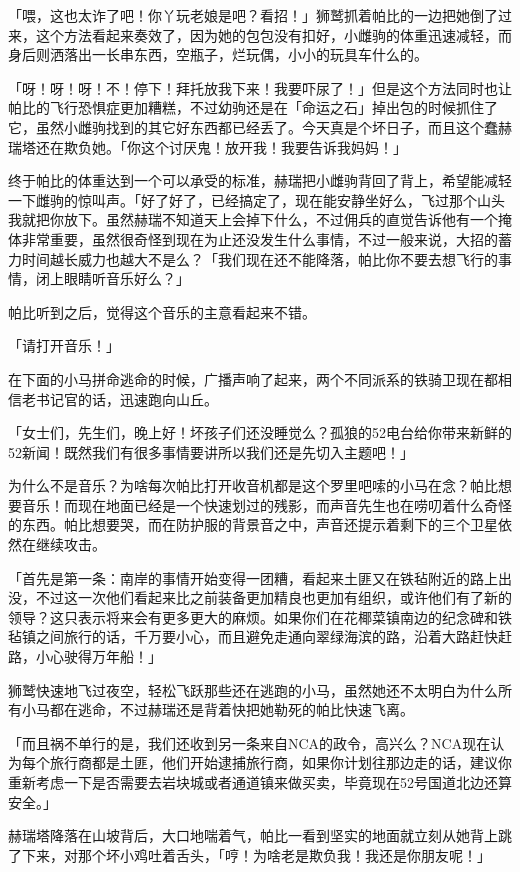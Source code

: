 「喂，这也太诈了吧！你丫玩老娘是吧？看招！」狮鹫抓着帕比的一边把她倒了过来，这个方法看起来奏效了，因为她的包包没有扣好，小雌驹的体重迅速减轻，而身后则洒落出一长串东西，空瓶子，烂玩偶，小小的玩具车什么的。

「呀！呀！呀！不！停下！拜托放我下来！我要吓尿了！」但是这个方法同时也让帕比的飞行恐惧症更加糟糕，不过幼驹还是在「命运之石」掉出包的时候抓住了它，虽然小雌驹找到的其它好东西都已经丢了。今天真是个坏日子，而且这个蠢赫瑞塔还在欺负她。「你这个讨厌鬼！放开我！我要告诉我妈妈！」

终于帕比的体重达到一个可以承受的标准，赫瑞把小雌驹背回了背上，希望能减轻一下雌驹的惊叫声。「好了好了，已经搞定了，现在能安静坐好么，飞过那个山头我就把你放下。虽然赫瑞不知道天上会掉下什么，不过佣兵的直觉告诉他有一个掩体非常重要，虽然很奇怪到现在为止还没发生什么事情，不过一般来说，大招的蓄力时间越长威力也越大不是么？「我们现在还不能降落，帕比你不要去想飞行的事情，闭上眼睛听音乐好么？」

帕比听到之后，觉得这个音乐的主意看起来不错。

「请打开音乐！」

在下面的小马拼命逃命的时候，广播声响了起来，两个不同派系的铁骑卫现在都相信老书记官的话，迅速跑向山丘。

「{\rt 女士们，先生们，晚上好！坏孩子们还没睡觉么？孤狼的52电台给你带来新鲜的52新闻！既然我们有很多事情要讲所以我们还是先切入主题吧！}」

为什么不是音乐？为啥每次帕比打开收音机都是这个罗里吧嗦的小马在念？帕比想要音乐！而现在地面已经是一个快速划过的残影，而声音先生也在唠叨着什么奇怪的东西。帕比想要哭，而在防护服的背景音之中，声音还提示着剩下的三个卫星依然在继续攻击。

「{\rt 首先是第一条：南岸的事情开始变得一团糟，看起来土匪又在铁毡附近的路上出没，不过这一次他们看起来比之前装备更加精良也更加有组织，或许他们有了新的领导？这只表示将来会有更多更大的麻烦。如果你们在花椰菜镇南边的纪念碑和铁毡镇之间旅行的话，千万要小心，而且避免走通向翠绿海滨的路，沿着大路赶快赶路，小心驶得万年船！}」

狮鹫快速地飞过夜空，轻松飞跃那些还在逃跑的小马，虽然她还不太明白为什么所有小马都在逃命，不过赫瑞还是背着快把她勒死的帕比快速飞离。

「{\rt 而且祸不单行的是，我们还收到另一条来自NCA的政令，高兴么？NCA现在认为每个旅行商都是土匪，他们开始逮捕旅行商，如果你计划往那边走的话，建议你重新考虑一下是否需要去岩块城或者通道镇来做买卖，毕竟现在52号国道北边还算安全。}」

赫瑞塔降落在山坡背后，大口地喘着气，帕比一看到坚实的地面就立刻从她背上跳了下来，对那个坏小鸡吐着舌头，「哼！为啥老是欺负我！我还是你朋友呢！」

